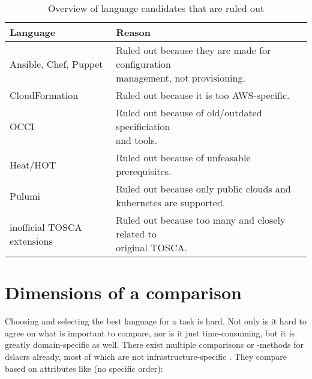 \begin{table}[H]
  \caption{Overview of language candidates that are ruled out}
  \begin{tabular}{ | l | l | }
    \hline
    Language & Reason \\
    \hline \hline
    Ansible, Chef, Puppet & \makecell{Ruled out because they are made for configuration \\ management, not provisioning.} \\
    \hline
    CloudFormation & Ruled out because it is too AWS-specific. \\
    \hline
    OCCI & \makecell{Ruled out because of old/outdated specificiation \\ and tools.} \\
    \hline
    Heat/HOT & Ruled out because of unfeasable prerequisites. \\
    \hline
    Pulumi & Ruled out because only public clouds and kubernetes are supported. \\
    \hline
    inofficial TOSCA extensions & \makecell{Ruled out because too many and closely related to \\ original TOSCA.} \\
    \hline
  \end{tabular}
  \label{tab:afterculling}
\end{table}

\section{Dimensions of a comparison}
Choosing and selecting the best language for a task is hard. Not only is it hard to agree on what is important to compare, nor is it just time-consuming, but it is greatly domain-specific as well.
There exist multiple comparisons or -methods for \gls{dslacr}s already, most of which are not infrastructure-specific \cite{comparative_study_of_dsl_tools} \cite{comparing_gpl_dsl} \cite{dsl_for_iac} \cite{allgemeine_modeltheorie}. %
They compare based on attributes like (no specific order):

